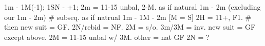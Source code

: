 1m - 1M(-1); 1SN - +1;
2m = 11-15 unbal, 2-M. as if natural 1m - 2m (excluding our 1m - 2m)
    # subseq. as if natrual 1m - 1M - 2m
    [M = S] 2H = 11+, F1.  # then new suit = GF. 2N/rebid = NF.
    2M = s/o. 3m/3M = inv. new suit = GF except above.
2M = 11-15 unbal w/ 3M.
other = nat GF
2N = ?